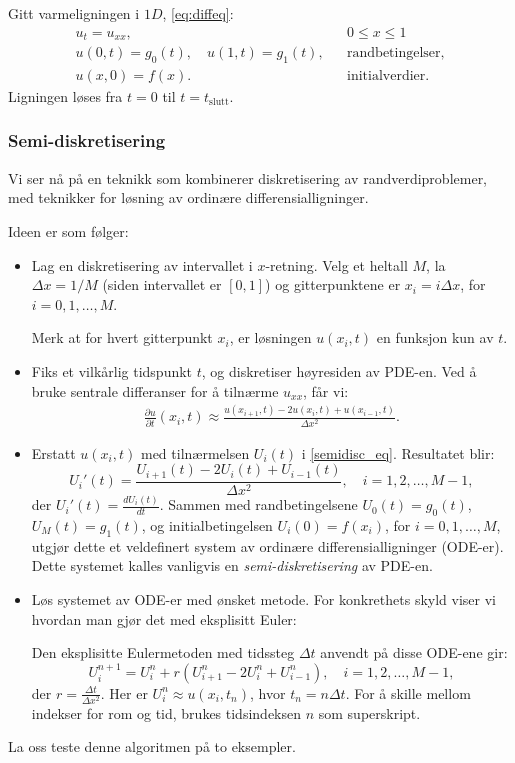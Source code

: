 Gitt varmeligningen i $1D$, \eqref{eq:diffeq}:
\begin{align*}
u_t = u_{xx}, && 0 \leq x \leq 1 \\
u(0, t) = g_0(t), \quad u(1, t) = g_1(t), && \text{randbetingelser},\\
u(x, 0) = f(x). && \text{initialverdier}.
\end{align*}
Ligningen løses fra \( t = 0 \) til \( t = t_{\text{slutt}} \).

\subsubsection*{Semi-diskretisering}
Vi ser nå på en teknikk som kombinerer diskretisering av randverdiproblemer, med teknikker for løsning av ordinære differensialligninger.

Ideen er som følger:
\begin{itemize}
\item[\textbf{Steg 1:}] Lag en diskretisering av intervallet i \( x \)-retning. Velg et heltall \( M \), la \( \Delta x = 1/M \) (siden intervallet er \([0, 1]\)) og gitterpunktene er \( x_i = i \Delta x \), for \( i = 0, 1, \ldots, M \).

Merk at for hvert gitterpunkt \( x_i \), er løsningen \( u(x_i, t) \) en funksjon kun av \( t \).
\item[\textbf{Steg 2:}] Fiks et vilkårlig tidspunkt \( t \), og diskretiser høyresiden av PDE-en. Ved å bruke sentrale differanser for å tilnærme \( u_{xx} \), får vi:
\begin{align}\label{semidisc_eq}
\frac{\partial u}{\partial t}(x_i, t) \approx \frac{u(x_{i+1}, t) - 2u(x_i, t) + u(x_{i-1}, t)}{\Delta x^2}.
\end{align}
\item[\textbf{Steg 3:}] Erstatt \( u(x_i, t) \) med tilnærmelsen \( U_i(t) \) i \eqref{semidisc_eq}. Resultatet blir:
\[
U_i'(t) = \frac{U_{i+1}(t) - 2U_i(t) + U_{i-1}(t)}{\Delta x^2}, \quad i = 1, 2, \ldots, M-1,
\]
der \( U_i'(t) = \frac{dU_i(t)}{dt} \). Sammen med randbetingelsene \( U_0(t) = g_0(t) \), \( U_M(t) = g_1(t) \), og initialbetingelsen \( U_i(0) = f(x_i) \), for \( i = 0, 1, \ldots, M \), utgjør dette et veldefinert system av ordinære differensialligninger (ODE-er).
Dette systemet kalles vanligvis en \textit{semi-diskretisering} av PDE-en.
\item[\textbf{Steg 4:}] Løs systemet av ODE-er med ønsket metode. For konkrethets skyld viser vi hvordan man gjør det med eksplisitt Euler:

Den eksplisitte Eulermetoden med tidssteg \( \Delta t \) anvendt på disse ODE-ene gir:
\[
U_i^{n+1} = U_i^n + r \left( U_{i+1}^n - 2U_i^n + U_{i-1}^n \right), \quad i = 1, 2, \ldots, M-1,
\]
der \( r = \frac{\Delta t}{\Delta x^2} \).
Her er \( U_i^n \approx u(x_i, t_n) \), hvor \( t_n = n \Delta t \). For å skille mellom indekser for rom og tid, brukes tidsindeksen \( n \) som superskript.
\end{itemize}
La oss teste denne algoritmen på to eksempler.

